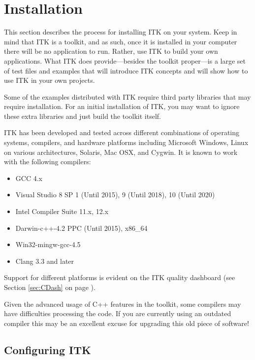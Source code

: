 \chapter{Installation}
\label{chapter:Installation}


This section describes the process for installing ITK on your system. Keep in
mind that ITK is a toolkit, and as such, once it is installed in your computer
there will be no application to run. Rather, use ITK to build your own
applications. What ITK does provide---besides the toolkit proper---is a large
set of test files and examples that will introduce ITK concepts and will show
how to use ITK in your own projects.

Some of the examples distributed with ITK require third party libraries that
may require installation. For an initial installation of ITK, you may want to
ignore these extra libraries and just build the toolkit itself.

ITK has been developed and tested across different combinations of
operating systems, compilers, and hardware platforms including
Microsoft Windows, Linux on various architectures, Solaris, Mac
OSX, and Cygwin.  It is known to work with the following compilers:

\begin{itemize}
\item GCC 4.x
\item Visual Studio 8 SP 1 (Until 2015), 9 (Until 2018), 10 (Until 2020)
\item Intel Compiler Suite 11.x, 12.x
\item Darwin-c++-4.2 PPC (Until 2015), x86\_64
\item Win32-mingw-gcc-4.5
\item Clang 3.3 and later
\end{itemize}

Support for different platforms is evident on the ITK quality dashboard
(see Section \ref{sec:CDash} on page \pageref{sec:CDash}).

Given the advanced usage of C++ features in the toolkit, some
compilers may have difficulties processing the code. If you are
currently using an outdated compiler this may be an excellent excuse
for upgrading this old piece of software!

\section{Configuring ITK}
\label{sec:ConfiguringITK}

